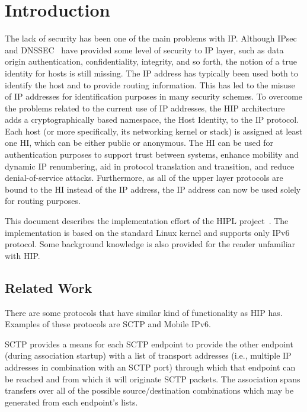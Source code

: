 \section{Introduction}
\label{sec:introduction}

The lack of security has been one of the main problems with
IP. Although \ac{IPsec}~\cite{rfc2401} and \ac{DNSSEC}~\cite{rfc3008}
have provided some level of security to IP layer, such as data origin
authentication, confidentiality, integrity, and so forth, the notion
of a true identity for hosts is still missing. The IP address has
typically been used both to identify the host and to provide routing
information. This has led to the misuse of IP addresses for
identification purposes in many security schemes. To overcome the
problems related to the current use of IP addresses, the \ac{HIP}
architecture adds a cryptographically based namespace, the Host
Identity, to the IP protocol.  Each host (or more specifically, its
networking kernel or stack) is assigned at least one \ac{HI}, which
can be either public or anonymous. The \ac{HI} can be used for
authentication purposes to support trust between systems, enhance
mobility and dynamic IP renumbering, aid in protocol translation and
transition, and reduce denial-of-service attacks. Furthermore, as all
of the upper layer protocols are bound to the \ac{HI} instead of the
IP address, the IP address can now be used solely for routing
purposes.

This document describes the implementation effort of the \ac{HIPL}
project~\cite{hipl}. The implementation is based on the standard Linux
kernel and supports only IPv6 protocol. Some background knowledge is
also provided for the reader unfamiliar with \ac{HIP}.

\subsection{Related Work}
\label{sec:related_work}

There are some protocols that have similar kind of functionality as
\ac{HIP} has. Examples of these protocols are \ac{SCTP} and Mobile
IPv6.

\ac{SCTP} provides a means for each \ac{SCTP} endpoint to provide the
other endpoint (during association startup) with a list of transport
addresses (i.e., multiple IP addresses in combination with an
\ac{SCTP} port) through which that endpoint can be reached and from
which it will originate \ac{SCTP} packets. The association spans
transfers over all of the possible source/destination combinations
which may be generated from each endpoint's lists. \cite{rfc2960}

